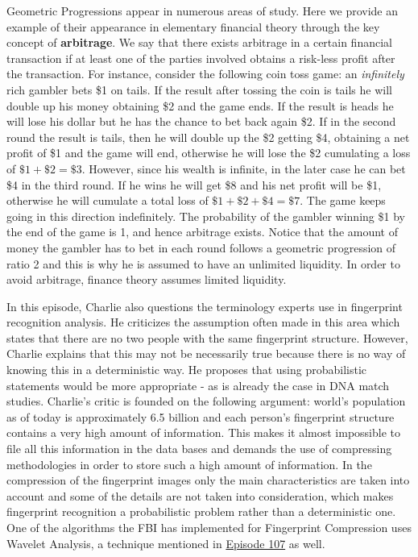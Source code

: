 \begin{ex}
Geometric Progressions appear in numerous areas of study. Here we provide an example of their appearance in elementary financial theory through the key concept of \textbf{arbitrage}. We say that there exists arbitrage in a certain financial transaction if at least one of the parties involved obtains a risk-less profit after the transaction. For instance, consider the following coin toss game: an \emph{infinitely} rich gambler bets \$1 on tails. If the result after tossing the coin is tails he will double up his money obtaining \$2 and the game ends. If the result is heads he will lose his dollar but he has the chance to bet back again \$2. If in the second round the result is tails, then he will double up the \$2 getting \$4, obtaining a net profit of \$1 and the game will end, otherwise he will lose the \$2 cumulating a loss of $\$1+\$2=\$3$. However, since his wealth is infinite, in the later case he can bet \$4 in the third round. If he wins he will get \$8 and his net profit will be \$1, otherwise he will cumulate a total loss of $\$1+\$2+\$4=\$7$. The game keeps going in this direction indefinitely. The probability of the gambler winning \$1 by the end of the game is 1, and hence arbitrage exists. Notice that the amount of money the gambler has to bet in each round follows a geometric progression of ratio 2 and this is why he is assumed to have an unlimited liquidity. In order to avoid arbitrage, finance theory assumes limited liquidity.
\end{ex}






In this episode, Charlie also questions the terminology experts use in fingerprint recognition analysis. He criticizes the assumption often made in this area which states that there are no two people with the same fingerprint structure. However, Charlie explains that this may not be necessarily true because there is no way of knowing this in a deterministic way. He proposes that using probabilistic statements would be more appropriate - as is already the case in DNA match studies. Charlie's critic is founded on the following argument: world's population as of today is approximately 6.5 billion and each person's fingerprint structure contains a very high amount of information. This makes it almost impossible to file all this information in the data bases and demands the use of compressing methodologies in order to store such a high amount of information. In the compression of the fingerprint images only the main characteristics are taken into account and some of the details are not taken into consideration, which makes fingerprint recognition a probabilistic problem rather than a deterministic one. One of the algorithms the FBI has implemented for Fingerprint Compression uses Wavelet Analysis, a technique mentioned in \hyperref[ep107]{Episode 107} as well.
